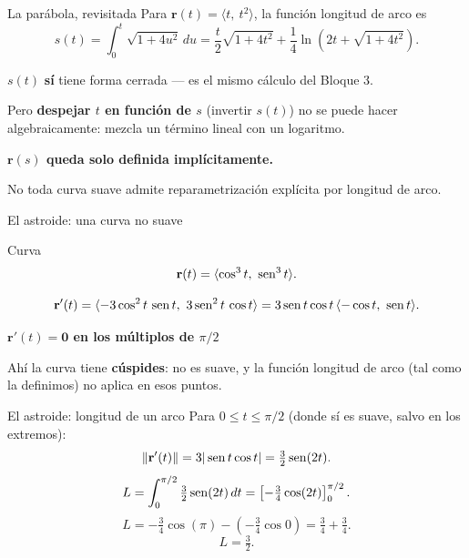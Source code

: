\documentclass[11pt,aspectratio=169]{beamer}
\begin{document}
\begin{frame}{La parábola, revisitada}
  Para $\mathbf r(t)=\langle t,\ t^2\rangle$, la función longitud de arco es
  \[
    s(t)=\int_0^t\sqrt{1+4u^2}\,du = \frac{t}{2}\sqrt{1+4t^2}+\frac14\ln\!\left(2t+\sqrt{1+4t^2}\right).
  \]
  \pause
  \begin{center}\normalsize\color{tealx} $s(t)$ \textbf{sí} tiene forma cerrada --- es el mismo cálculo del Bloque 3.\end{center}
  \pause
  \vspace{6pt}
  Pero \textbf{despejar $t$ en función de $s$} (invertir $s(t)$) no se puede hacer algebraicamente: mezcla un término lineal con un logaritmo.
  \pause
  \begin{center}
  \normalsize\color{brick}\textbf{$\mathbf r(s)$ queda solo definida implícitamente.}
  \end{center}
  \vspace{4pt}
  \begin{center}\small\color{gray60} No toda curva suave admite reparametrización explícita por longitud de arco.\end{center}
\end{frame}

\begin{frame}{El astroide: una curva no suave}
  \begin{block}{Curva}
    \[
      \mathbf r(t)=\langle \cos^3 t,\ \operatorname{sen}^3 t\rangle.
    \]
  \end{block}
  \pause
  \[
    \mathbf r'(t) = \langle -3\cos^2t\,\operatorname{sen} t,\ 3\operatorname{sen}^2t\,\cos t\rangle
    = 3\operatorname{sen} t\cos t\,\langle -\cos t,\ \operatorname{sen} t\rangle.
  \]
  \pause
  \begin{center}\normalsize\color{brick}\textbf{$\mathbf r'(t)=\mathbf 0$ en los múltiplos de $\pi/2$}\end{center}
  \vspace{6pt}
  \pause
  \begin{center}\small\color{gray60} Ahí la curva tiene \textbf{cúspides}: no es suave, y la función longitud de arco (tal como la definimos) no aplica en esos puntos.\end{center}
\end{frame}

\begin{frame}{El astroide: longitud de un arco}
  Para $0\le t\le \pi/2$ (donde sí es suave, salvo en los extremos):
  \[
    \|\mathbf r'(t)\| = 3|\operatorname{sen} t\cos t| = \tfrac32\operatorname{sen}(2t).
  \]
  \pause
  \[
    L=\int_0^{\pi/2} \tfrac32\operatorname{sen}(2t)\,dt = \left[-\tfrac34\cos(2t)\right]_0^{\pi/2}.
  \]
  \pause
  \[
    L = -\tfrac34\cos(\pi) - \left(-\tfrac34\cos 0\right) = \tfrac34+\tfrac34.
  \]
  \pause
  \[
    \boxed{L=\tfrac32.}
  \]
\end{frame}
\end{document}
